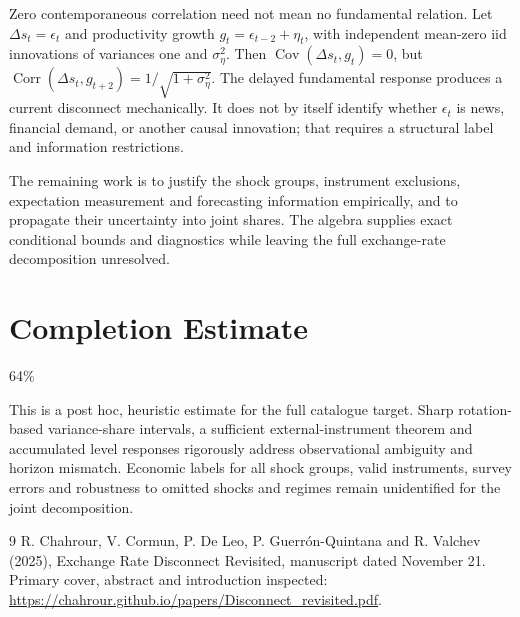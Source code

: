 \documentclass[11pt]{article}
\newcommand{\Cov}{\operatorname{Cov}}
\begin{document}
Zero contemporaneous correlation need not mean no fundamental relation. Let $\Delta s_t=\epsilon_t$ and productivity growth $g_t=\epsilon_{t-2}+\eta_t$, with independent mean-zero iid innovations of variances one and $\sigma_\eta^2$. Then $\Cov(\Delta s_t,g_t)=0$, but
$\operatorname{Corr}(\Delta s_t,g_{t+2})=1/\sqrt{1+\sigma_\eta^2}$.
The delayed fundamental response produces a current disconnect mechanically. It does not by itself identify whether $\epsilon_t$ is news, financial demand, or another causal innovation; that requires a structural label and information restrictions.

The remaining work is to justify the shock groups, instrument exclusions, expectation measurement and forecasting information empirically, and to propagate their uncertainty into joint shares. The algebra supplies exact conditional bounds and diagnostics while leaving the full exchange-rate decomposition unresolved.

\section{Completion Estimate}
64\%

This is a post hoc, heuristic estimate for the full catalogue target.
Sharp rotation-based variance-share intervals, a sufficient external-instrument theorem and accumulated level responses rigorously address observational ambiguity and horizon mismatch. Economic labels for all shock groups, valid instruments, survey errors and robustness to omitted shocks and regimes remain unidentified for the joint decomposition.

\begin{thebibliography}{9}
 R. Chahrour, V. Cormun, P. De Leo, P. Guerr\'on-Quintana and R. Valchev (2025), Exchange Rate Disconnect Revisited, manuscript dated November 21. Primary cover, abstract and introduction inspected: \url{https://chahrour.github.io/papers/Disconnect_revisited.pdf}.
\end{thebibliography}
\end{document}
